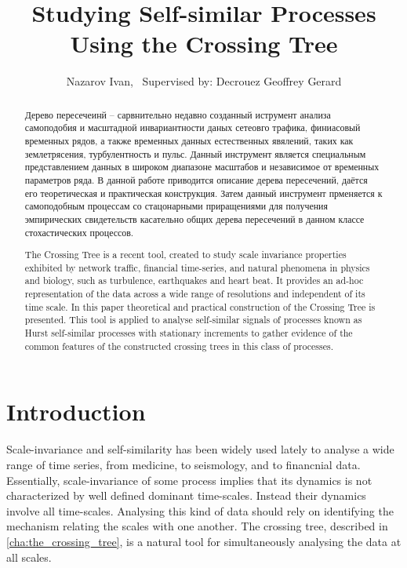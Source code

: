 \documentclass[a4paper,14pt]{extreport}
\title{Studying Self-similar Processes Using the Crossing Tree}
\author{Nazarov Ivan, \rus{101мНОД(ИССА)}\
	{\small Supervised by: Decrouez Geoffrey Gerard}}
\begin{document}

\clearpage


\clearpage

\begin{abstract}
Дерево пересечеинй -- сарвнительно недавно созданный иструмент анализа самоподобия
и масштадной инвариантности даных сетеовго трафика, финиасовый временных рядов, а
также временных данных естественных явялений, таких как землетрясения, турбулентность
и пульс. Данный инструмент является специальным представлением данных в широком
диапазоне масштабов и независимое от временных параметров ряда. В данной работе
приводится описание дерева пересечений, даётся его теоретическая и практическая
конструкция. Затем данный инструмент прменяется к самоподобным процессам со стацонарными
приращениями для получения эмпирических свидетельств касательно общих 
дерева пересечений в данном классе стохастических процессов.
\end{abstract}

\begin{abstract}
The Crossing Tree is a recent tool, created to study scale invariance properties
exhibited by network traffic, financial time-series, and natural phenomena in physics
and biology, such as turbulence, earthquakes and heart beat. It provides an ad-hoc
representation of the data across a wide range of resolutions and independent of
its time scale. In this paper theoretical and practical construction of the Crossing
Tree is presented. This tool is applied to analyse self-similar signals of processes
known as Hurst self-similar processes with stationary increments to gather evidence 
of the common features of the constructed crossing trees in this class of processes.
\end{abstract}

\tableofcontents
\clearpage
{}


\chapter{Introduction} %
\label{cha:introduction}

Scale-invariance and self-similarity has been widely used lately to analyse a wide
range of time series, from medicine, to seismology, and to financnial data.
Essentially, scale-invariance of some process implies that its dynamics is not
characterized by well defined dominant time-scales. Instead their dynamics
involve all time-scales. Analysing this kind of data should rely on identifying
the mechanism relating the scales with one another. The crossing tree, described in \ref{cha:the_crossing_tree},
is a natural tool for simultaneously analysing the data at all scales.
\end{document}
